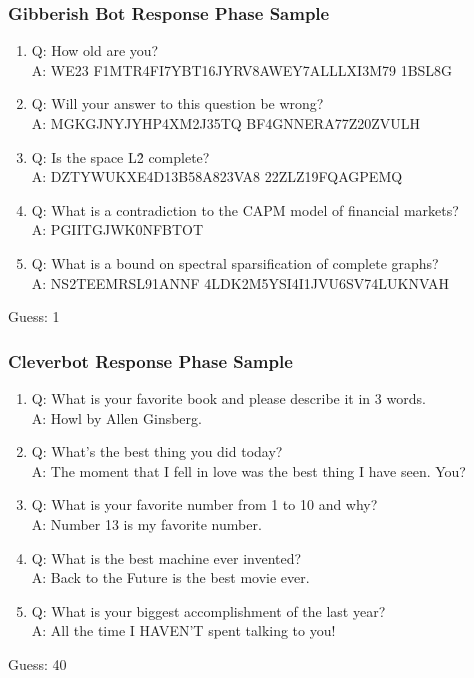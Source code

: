\subsubsection{Gibberish Bot Response Phase Sample}
\begin{enumerate}
\item Q: How old are you?
\\A: WE23 F1MTR4FI7YBT16JYRV8AWEY7ALLLXI3M79 1BSL8G

\item Q: Will your answer to this question be wrong?
\\A: MGKGJNYJYHP4XM2J35TQ BF4GNNERA77Z20ZVULH

\item Q: Is the space L\^2 complete?
\\A: DZTYWUKXE4D13B58A823VA8 22ZLZ19FQAGPEMQ

\item Q: What is a contradiction to the CAPM model of financial markets?
\\A: PGIITGJWK0NFBTOT

\item Q: What is a bound on spectral sparsification of complete graphs?
\\A: NS2TEEMRSL91ANNF 4LDK2M5YSI4I1JVU6SV74LUKNVAH
\end{enumerate}
Guess: 1

\subsubsection{Cleverbot Response Phase Sample}
\begin{enumerate}
\item Q: What is your favorite book and please describe it in 3 words.
\\A: Howl by Allen Ginsberg.

\item Q: What's the best thing you did today?
\\A: The moment that I fell in love was the best thing I have seen. You?

\item Q: What is your favorite number from 1 to 10 and why?
\\A: Number 13 is my favorite number.

\item Q: What is the best machine ever invented?
\\A: Back to the Future is the best movie ever.

\item Q: What is your biggest accomplishment of the last year?
\\A: All the time I HAVEN'T spent talking to you!
\end{enumerate}
Guess: 40

